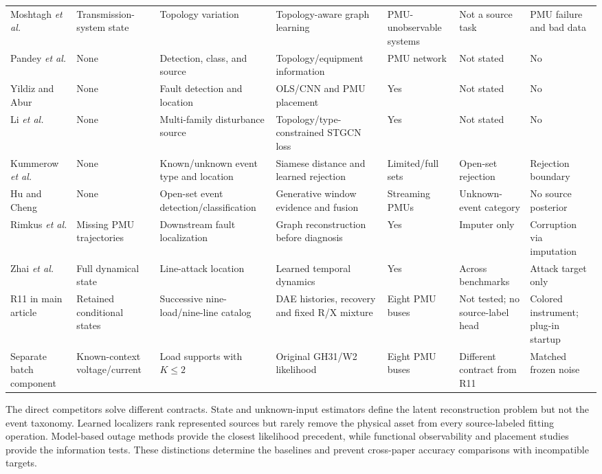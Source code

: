 \documentclass{ieeeaccess}
\begin{document}
\begin{table}[t]
\begin{tabularx}{\textwidth}{@{}lXXXXXX@{}}
Moshtagh \emph{et al.} \cite{moshtagh2025topology} & Transmission-system state & Topology variation & Topology-aware graph learning & PMU-unobservable systems & Not a source task & PMU failure and bad data \\
Pandey \emph{et al.} \cite{pandey2020realtime} & None & Detection, class, and source & Topology/equipment information & PMU network & Not stated & No \\
Yildiz and Abur \cite{yildiz2024few} & None & Fault detection and location & OLS/CNN and PMU placement & Yes & Not stated & No \\
Li \emph{et al.} \cite{li2024knowledge} & None & Multi-family disturbance source & Topology/type-constrained STGCN loss & Yes & Not stated & No \\
Kummerow \emph{et al.} \cite{kummerow2023sigmoid} & None & Known/unknown event type and location & Siamese distance and learned rejection & Limited/full sets & Open-set rejection & Rejection boundary \\
Hu and Cheng \cite{hu2026openset} & None & Open-set event detection/classification & Generative window evidence and fusion & Streaming PMUs & Unknown-event category & No source posterior \\
Rimkus \emph{et al.} \cite{rimkus2025gnn} & Missing PMU trajectories & Downstream fault localization & Graph reconstruction before diagnosis & Yes & Imputer only & Corruption via imputation \\
Zhai \emph{et al.} \cite{zhai2025partial} & Full dynamical state & Line-attack location & Learned temporal dynamics & Yes & Across benchmarks & Attack target only \\
R11 in main article & Retained conditional states & Successive nine-load/nine-line catalog & DAE histories, recovery and fixed R/X mixture & Eight PMU buses & Not tested; no source-label head & Colored instrument; plug-in startup \\
Separate batch component & Known-context voltage/current & Load supports with $K\le2$ & Original GH31/W2 likelihood & Eight PMU buses & Different contract from R11 & Matched frozen noise \\
\bottomrule
\end{tabularx}
\end{table}

The direct competitors solve different contracts. State and unknown-input estimators define the latent reconstruction problem but not the event taxonomy. Learned localizers rank represented sources but rarely remove the physical asset from every source-labeled fitting operation. Model-based outage methods provide the closest likelihood precedent, while functional observability and placement studies provide the information tests. These distinctions determine the baselines and prevent cross-paper accuracy comparisons with incompatible targets.
\end{document}
